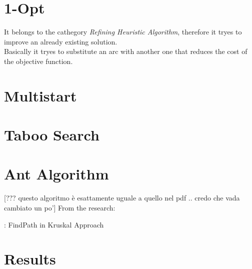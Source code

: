 \section{1-Opt}
It belongs to the cathegory \textit{Refining Heuristic Algorithm}, therefore it tryes to                                                                  improve an already existing solution.                                                                   \\
Basically it tryes to substitute an arc with another one that reduces the cost of the objective function. \\
\section{Multistart}

\section{Taboo Search}

\section{Ant Algorithm}
[??? questo algoritmo è esattamente uguale a quello nel pdf .. credo che vada cambiato un po']
From the \cite{nedlin2017ant} research: 
\begin{algorithm}[H]
\caption{: FindPath in Kruskal Approach} \label{alg:SC}
\begin{algorithmic} 
\REPEAT
{}
\end{algorithmic}
\end{algorithm}
\section{Results}



